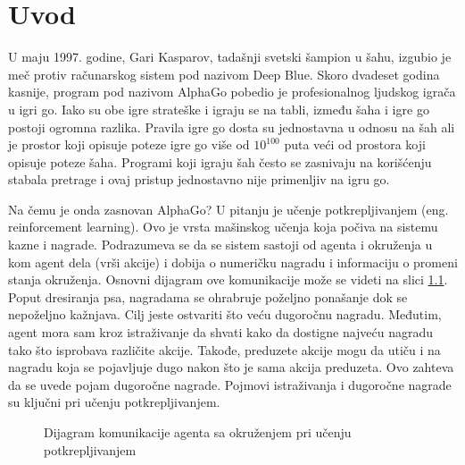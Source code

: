 \chapter{Uvod}



U maju 1997. godine, Gari Kasparov, tadašnji svetski šampion u šahu, izgubio je meč protiv računarskog sistem pod nazivom Deep Blue. Skoro dvadeset godina kasnije, program pod nazivom AlphaGo pobedio je profesionalnog ljudskog igrača u igri go. Iako su obe igre strateške i igraju se na tabli, između šaha i igre go postoji ogromna razlika. Pravila igre go dosta su jednostavna u odnosu na šah ali je prostor koji opisuje poteze igre go više od $10^{100}$ puta veći od prostora koji opisuje poteze šaha. Programi koji igraju šah često se zasnivaju na korišćenju stabala pretrage i ovaj pristup jednostavno nije primenljiv na igru go. \par

Na čemu je onda zasnovan AlphaGo? U pitanju je učenje potkrepljivanjem (eng. reinforcement learning). Ovo je vrsta mašinskog učenja koja počiva na sistemu kazne i nagrade. Podrazumeva se da se sistem sastoji od agenta i okruženja u kom agent dela (vrši akcije) i dobija o numeričku nagradu i informaciju o promeni stanja okruženja. Osnovni dijagram ove komunikacije može se videti na slici \ref{fig:rl_diag}. Poput dresiranja psa, nagradama se ohrabruje poželjno ponašanje dok se nepoželjno kažnjava. Cilj jeste ostvariti što veću dugoročnu nagradu. Međutim, agent mora sam kroz istraživanje da shvati kako da dostigne najveću nagradu tako što isprobava različite akcije. Takođe, preduzete akcije mogu da utiču i na nagradu koja se pojavljuje dugo nakon što je sama akcija preduzeta. Ovo zahteva da se uvede pojam dugoročne nagrade. Pojmovi istraživanja i dugoročne nagrade su ključni pri učenju potkrepljivanjem. 

\begin{figure}
	\centering
	\resizebox{.4\linewidth}{!}{}
	\caption{Dijagram komunikacije agenta sa okruženjem pri učenju potkrepljivanjem}
	\label{fig:rl_diag}
\end{figure}


